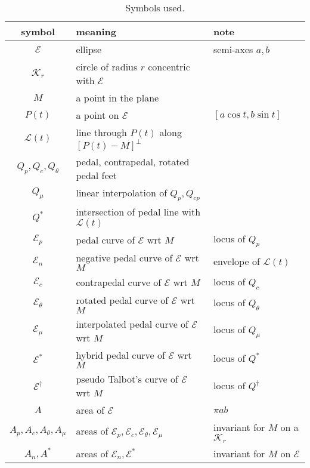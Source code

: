 \begin{table}[!htbp]
\small
\begin{tabular}{|c|l|l|}
\hline
symbol & meaning & note \\
\hline
$\mathcal{E}$ & ellipse & semi-axes $a,b$\\
$\mathcal{K}_r$ & circle of radius $r$ concentric with $\mathcal{E}$ & \\
$M$ & a point in the plane & \\
$P(t)$ & a point on $\mathcal{E}$ & $[a\cos{t},b\sin{t}]$ \\
$\mathcal{L}(t)$ & line through $P(t)$ along $[P(t)-M]^\perp$ & \\
$Q_p,Q_{c},Q_{\theta}$ & pedal, contrapedal, rotated pedal feet & \\
$Q_{\mu}$ & linear interpolation of $Q_p,Q_{cp}$ & \\
$Q^*$ & intersection of pedal line with $\mathcal{L}(t)$ & \\
\hline
$\mathcal{E}_p$ & pedal curve of $\mathcal{E}$ wrt $M$ & locus of $Q_p$\\
$\mathcal{E}_{n}$ & negative pedal curve of $\mathcal{E}$ wrt $M$ & envelope of $\mathcal{L}(t)$ \\
$\mathcal{E}_{c}$ & contrapedal curve of $\mathcal{E}$ wrt $M$ & locus of $Q_{c}$  \\
$\mathcal{E}_{\theta}$ & rotated pedal curve of $\mathcal{E}$ wrt $M$ & locus of $Q_{\theta}$  \\
$\mathcal{E}_{\mu}$ & interpolated pedal curve of $\mathcal{E}$ wrt $M$ &  locus of $Q_{\mu}$ \\
$\mathcal{E}^*$ & hybrid pedal curve of $\mathcal{E}$ wrt $M$ & locus of $Q^*$ \\
$\mathcal{E}^\dagger$ & pseudo Talbot's curve of $\mathcal{E}$ wrt $M$ & locus of $Q^\dagger$ \\
\hline
$A$ & area of $\mathcal{E}$ & $\pi{a}{b}$ \\
$A_p,A_c,A_{\theta},A_\mu$ & areas of $\mathcal{E}_p,\mathcal{E}_c,\mathcal{E}_{\theta},\mathcal{E}_{\mu}$ & invariant for $M$ on a $\mathcal{K}_r$ \\
$A_n,A^*$ & areas of $\mathcal{E}_n,\mathcal{E}^*$ & invariant for $M$ on $\mathcal{E}$ \\
\hline
\end{tabular}
\caption{Symbols used.}
\end{table}
